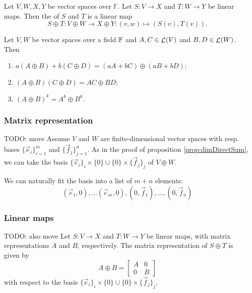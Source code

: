 \begin{definition}
Let $V,W, X,Y$ be vector spaces over $\mathbb{F}$. Let $S: V\to X$ and $T: W\to Y$ be linear maps. Then the  of $S$ and $T$ is a linear map
\[ S\oplus T: V \oplus W \to X\oplus Y: (v,w) \mapsto (S(v), T(v)). \]
\end{definition}

\begin{lemma}
Let $V,W$ be vector spaces over a field $\mathbb{F}$ and $A,C\in\mathop{\mathcal{L}}(V)$ and $B,D\in\mathop{\mathcal{L}}(W)$. Then
\begin{enumerate}
\item $a(A\oplus B) + b(C\oplus D) = (aA+bC)\oplus (aB + bD)$;
\item $(A\oplus B)(C\oplus D) = AC\oplus BD$;
\item $(A\oplus B)^k = A^k\oplus B^k$.
\end{enumerate}
\end{lemma}

\subsubsection{Matrix representation}
TODO: move
Assume $V$ and $W$ are finite-dimensional vector spaces with resp. bases $\{\vec{e}_i\}_{i=1}^m$ and $\{\vec{f}_j\}_{j=1}^n$.
As in the proof of proposition \ref{prop:dimDirectSum}, we can take the basis $\{\vec{e}_i\}_i\times\{0\} \cup \{0\}\times\{\vec{f}_j\}_j$ of $V\oplus W$.

We can naturally fit the basis into a list of $m+n$ elements:
\[ (\vec{e}_1,0),\ldots (\vec{e}_m, 0), (0, \vec{f}_1), \ldots, (0,\vec{f}_n)  \]
\subsubsection{Linear maps}
TODO: also move
Let $S: V\to X$ and $T:W\to Y$ be linear maps, with matrix representations $A$ and $B$, respectively. The matrix representation of $S\oplus T$ is given by
\[ A\oplus B = \begin{bmatrix}
A & 0 \\
0 & B
\end{bmatrix} \]
with respect to the basis $\{\vec{e}_i\}_i\times\{0\} \cup \{0\}\times\{\vec{f}_j\}_j$.


